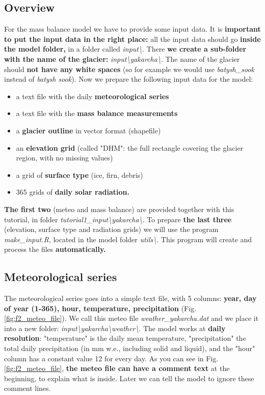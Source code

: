 \documentclass[15pt]{extarticle}
\begin{document}
\subsection{Overview}
For the mass balance model we have to provide some input data. It is \textbf{important to put the input data in the right place:} all the input data should go \textbf{inside the model folder,} in a folder called \textit{input\textbackslash}. There \textbf{we create a sub-folder with the name of the glacier:} \textit{input\textbackslash yakarcha\textbackslash}. The name of the glacier should \textbf{not have any white spaces} (so for example we would use \textit{batysh\_sook} instead of \textit{batysh sook}). Now we prepare the following input data for the model:
\begin{itemize}
    \item a text file with the daily \textbf{meteorological series}
    \item a text file with the \textbf{mass balance measurements}
    \item a \textbf{glacier outline} in vector format (shapefile)
    \item an \textbf{elevation grid} (called "DHM": the full rectangle covering the glacier region, with no missing values)
    \item a grid of \textbf{surface type} (ice, firn, debris)
    \item 365 grids of \textbf{daily solar radiation.}
\end{itemize}
\textbf{The first two} (meteo and mass balance) are provided together with this tutorial, in folder \textit{tutorial1\_input\textbackslash yakarcha\textbackslash}. To prepare \textbf{the last three} (elevation, surface type and radiation grids) we will use the program \textit{make\_input.R}, located in the model folder \textit{utils\textbackslash}. This program will create and process the files \textbf{automatically.}

\subsection{Meteorological series}
\label{sect:input_meteo}
The meteorological series goes into a simple text file, with 5 columns: \textbf{year, day of year (1-365), hour, temperature, precipitation} (Fig. \ref{fig:f2_meteo_file}). We call this meteo file \textit{weather\_yakarcha.dat} and we place it into a new folder: \textit{input\textbackslash yakarcha\textbackslash weather\textbackslash}. The model works at \textbf{daily resolution}: "temperature" is the daily mean temperature, "precipitation" the total daily precipitation (in mm w.e., including solid and liquid), and the "hour" column has a constant value 12 for every day. As you can see in Fig. \ref{fig:f2_meteo_file}, \textbf{the meteo file can have a comment text} at the beginning, to explain what is inside. Later we can tell the model to ignore these comment lines.
\end{document}
